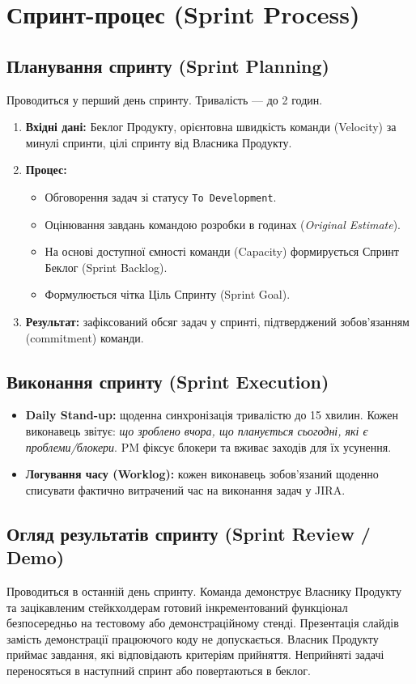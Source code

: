 \documentclass{article}
\begin{document}
\section{Спринт-процес (Sprint Process)}

\subsection{Планування спринту (Sprint Planning)}
Проводиться у перший день спринту. Тривалість --- до 2 годин.
\begin{enumerate}
    \item \textbf{Вхідні дані:} Беклог Продукту, орієнтовна швидкість команди (Velocity) за минулі спринти, цілі спринту від Власника Продукту.
    \item \textbf{Процес:}
    \begin{itemize}
        \item Обговорення задач зі статусу \texttt{To Development}.
        \item Оцінювання завдань командою розробки в годинах (\emph{Original Estimate}).
        \item На основі доступної ємності команди (Capacity) формирується Спринт Беклог (Sprint Backlog).
        \item Формулюється чітка Ціль Спринту (Sprint Goal).
    \end{itemize}
    \item \textbf{Результат:} зафіксований обсяг задач у спринті, підтверджений зобов'язанням (commitment) команди.
\end{enumerate}

\subsection{Виконання спринту (Sprint Execution)}
\begin{itemize}
    \item \textbf{Daily Stand-up:} щоденна синхронізація тривалістю до 15 хвилин. Кожен виконавець звітує: \emph{що зроблено вчора, що планується сьогодні, які є проблеми/блокери}. PM фіксує блокери та вживає заходів для їх усунення.
    \item \textbf{Логування часу (Worklog):} кожен виконавець зобов'язаний щоденно списувати фактично витрачений час на виконання задач у JIRA.
\end{itemize}

\subsection{Огляд результатів спринту (Sprint Review / Demo)}
Проводиться в останній день спринту. Команда демонструє Власнику Продукту та зацікавленим стейкхолдерам готовий інкрементований функціонал безпосередньо на тестовому або демонстраційному стенді. Презентація слайдів замість демонстрації працюючого коду не допускається. Власник Продукту приймає завдання, які відповідають критеріям прийняття. Неприйняті задачі переносяться в наступний спринт або повертаються в беклог.
\end{document}
